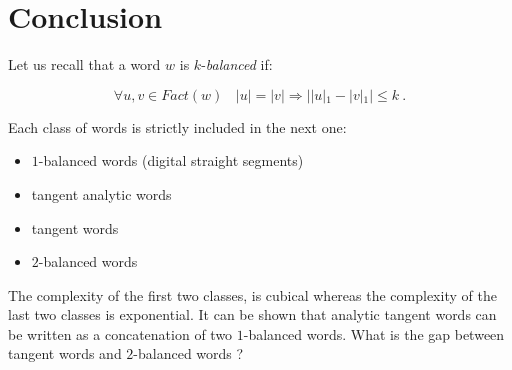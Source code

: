 \documentclass[preliminary]{eptcs}
\begin{document}
\section{Conclusion}

Let us recall that a word $w$ is $k$-\emph{balanced} if:

$$\forall u,v \in Fact(w) \ \ \ \ |u| = |v| \Rightarrow | |u|_1 - |v|_1
|\leq k \ .$$


Each class of words is strictly included in the next one:
\begin{itemize}
\item $1$-balanced words (digital straight segments)
\item tangent analytic words
\item tangent words
\item $2$-balanced words \\
\end{itemize}
The complexity of the first two classes, is cubical whereas the complexity
of the last two classes is exponential.
It can be shown that analytic tangent words can be written as a
concatenation of two $1$-balanced words. What is the gap between tangent
words and $2$-balanced words ?




\end{document}
